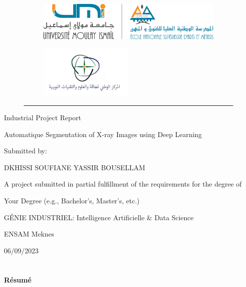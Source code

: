 \documentclass{report}
\newcommand{\falcon}{%
	\begin{figure}[htbp]
		\centering
		\begin{subfigure}{0.45\textwidth}
			\centering
			\includegraphics[width=1\textwidth]{LOGO_ENSAM.png}
		\end{subfigure}
		\begin{subfigure}{0.45\textwidth}
			\centering
			\includegraphics[width=0.5\textwidth]{Cnesten.jpg}
		\end{subfigure}
		\hrule %
	\end{figure}
}
\begin{document}
	
	\begin{titlepage}
		\falcon        
		\vspace*{2cm}
		
		\centering
		{\LARGE Industrial Project Report \par}
		
		\vspace{1cm}
		
		{\Large Automatique Segmentation of X-ray Images using Deep Learning \par}
		
		\vspace{1.5cm}
		
		{\large Submitted by: \par}
		\vspace{0.5cm}
		
		{\Large DKHISSI SOUFIANE \quad YASSIR BOUSELLAM \par}
		
		
		\vfill
		
		{\large A project submitted in partial fulfillment of the requirements for the degree of \par}
		\vspace{0.5cm}
		
		{\Large Your Degree (e.g., Bachelor's, Master's, etc.) \par}
		
		\vspace{0.5cm}
		
		{\Large GÉNIE INDUSTRIEL: Intelligence Artificielle \& Data Science \par}
		
		\vspace{0.5cm}
		
		{\Large ENSAM Meknes \par}
		
		\vspace{0.5cm}
		
		{\Large 06/09/2023 \par}
	\end{titlepage}
	
	\newpage  %
	
	\section*{}
	\begin{center}
		\huge\textbf{Résumé}
	\end{center}
	
\end{document}
